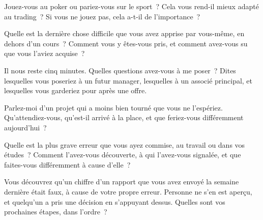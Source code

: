 \begin{question}\label{iq:iv2:behavioural-and-fit:12}
Jouez-vous au poker ou pariez-vous sur le sport~? Cela vous rend-il mieux adapté au trading~? Si vous ne jouez pas, cela a-t-il de l'importance~?
\end{question}

\begin{question}\label{iq:iv2:behavioural-and-fit:13}
Quelle est la dernière chose difficile que vous avez apprise par vous-même, en dehors d'un cours~? Comment vous y êtes-vous pris, et comment avez-vous su que vous l'aviez acquise~?
\end{question}

\begin{question}\label{iq:iv2:behavioural-and-fit:14}
Il nous reste cinq minutes. Quelles questions avez-vous à me poser~? Dites lesquelles vous poseriez à un futur manager, lesquelles à un associé principal, et lesquelles vous garderiez pour après une offre.
\end{question}

\begin{question}\label{iq:iv2:behavioural-and-fit:15}
Parlez-moi d'un projet qui a moins bien tourné que vous ne l'espériez. Qu'attendiez-vous, qu'est-il arrivé à la place, et que feriez-vous différemment aujourd'hui~?
\end{question}

\begin{question}\label{iq:iv2:behavioural-and-fit:16}
Quelle est la plus grave erreur que vous ayez commise, au travail ou dans vos études~? Comment l'avez-vous découverte, à qui l'avez-vous signalée, et que faites-vous différemment à cause d'elle~?
\end{question}

\begin{question}\label{iq:iv2:behavioural-and-fit:17}
Vous découvrez qu'un chiffre d'un rapport que vous avez envoyé la semaine dernière était faux, à cause de votre propre erreur. Personne ne s'en est aperçu, et quelqu'un a pris une décision en s'appuyant dessus. Quelles sont vos prochaines étapes, dans l'ordre~?
\end{question}

